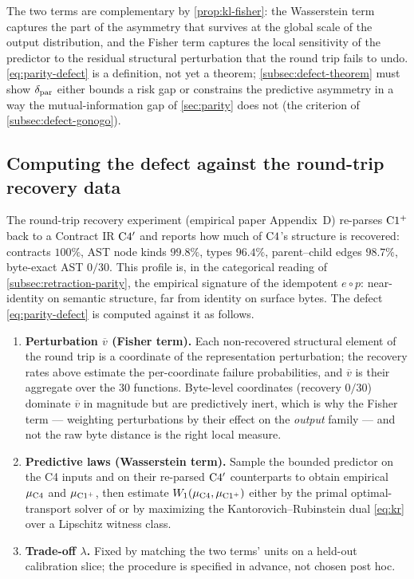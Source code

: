 The two terms are complementary by \cref{prop:kl-fisher}: the Wasserstein term
captures the part of the asymmetry that survives at the global scale of the
output distribution, and the Fisher term captures the local sensitivity of the
predictor to the residual structural perturbation that the round trip fails to
undo. \cref{eq:parity-defect} is a definition, not yet a theorem;
\cref{subsec:defect-theorem} must show $\delta_{\mathrm{par}}$ either bounds a risk gap or constrains the predictive
asymmetry in a way the mutual-information gap of \cref{sec:parity} does not
(the criterion of \cref{subsec:defect-gonogo}).

\subsection{Computing the defect against the round-trip recovery data}
\label{subsec:defect-r4}

The round-trip recovery experiment (empirical paper Appendix~D) re-parses
$\mathrm{C1^{+}}$ back to a Contract IR $\mathrm{C}4'$ and reports how much of
$\mathrm{C}4$'s structure is recovered: contracts $100\%$, AST node kinds
$99.8\%$, types $96.4\%$, parent--child edges $98.7\%$, byte-exact AST
$0/30$. This profile is, in the categorical reading of
\cref{subsec:retraction-parity}, the empirical signature of the idempotent
$e\circ p$: near-identity on semantic structure, far from identity on surface
bytes. The defect \eqref{eq:parity-defect} is computed against it as follows.

\begin{enumerate}
  \item \textbf{Perturbation $\overline{v}$ (Fisher term).} Each
    non-recovered structural element of the round trip is a coordinate of the
    representation perturbation; the recovery rates above estimate the
    per-coordinate failure probabilities, and $\overline{v}$ is their
    aggregate over the $30$ functions. Byte-level coordinates (recovery $0/30$)
    dominate $\overline{v}$ in magnitude but are predictively inert, which is
    why the Fisher term --- weighting perturbations by their effect on the
    \emph{output} family --- and not the raw byte distance is the right local
    measure.
  \item \textbf{Predictive laws (Wasserstein term).} Sample the bounded
    predictor on the C4 inputs and on their re-parsed $\mathrm{C}4'$
    counterparts to obtain empirical $\mu_{\mathrm{C}4}$ and
    $\mu_{\mathrm{C1^{+}}}$, then estimate
    $W_{1}(\mu_{\mathrm{C}4},\mu_{\mathrm{C1^{+}}})$ either by the
    primal optimal-transport solver of \citet[§2--3]{peyrecuturi2019} or by
    maximizing the Kantorovich--Rubinstein dual \eqref{eq:kr} over a Lipschitz
    witness class.
  \item \textbf{Trade-off $\lambda$.} Fixed by matching the two terms' units on
    a held-out calibration slice; the procedure is specified in advance,
    not chosen post hoc.
\end{enumerate}

